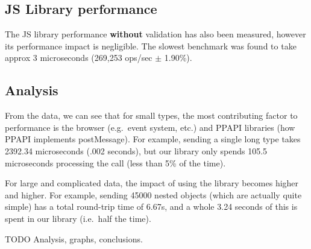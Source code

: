\subsection{JS Library performance}\label{js-library-performance}

The JS library performance \textbf{without} validation has also been
measured, however its performance impact is negligible. The slowest
benchmark was found to take approx 3 microseconds (269,253 ops/sec
$\pm$  1.90\%).

\subsection{Analysis}\label{analysis}

From the data, we can see that for small types, the most contributing
factor to performance is the browser (e.g.~event system, etc.) and PPAPI
libraries (how PPAPI implements postMessage). For example, sending a
single long type takes 2392.34 microseconds (.002 seconds), but our
library only spends 105.5 microseconds processing the call (less than
5\% of the time).

For large and complicated data, the impact of using the library becomes
higher and higher. For example, sending 45000 nested objects (which are
actually quite simple) has a total round-trip time of 6.67s, and a whole
3.24 seconds of this is spent in our library (i.e.~half the time).

TODO Analysis, graphs, conclusions.

